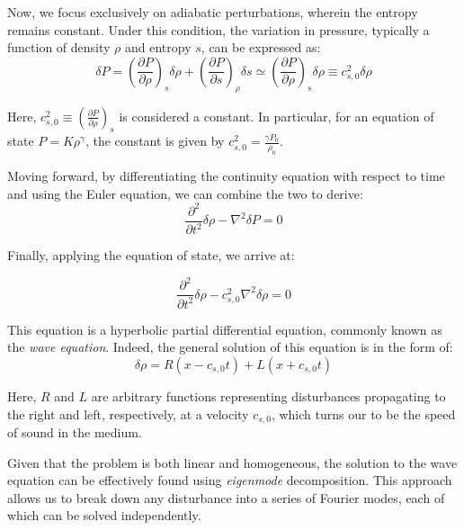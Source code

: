 Now, we focus exclusively on adiabatic perturbations, wherein the entropy remains constant. Under this condition, the variation in pressure, typically a function of density \( \rho \) and entropy \( s \), can be expressed as:
%
\begin{equation}
\delta P = \left( \frac{\partial P}{\partial \rho} \right)_s \delta \rho + \left( \frac{\partial P}{\partial s} \right)_\rho \delta s \simeq \left( \frac{\partial P}{\partial \rho} \right)_s \delta \rho \equiv c_{s,0}^2 \delta \rho
\end{equation}

Here, \( c_{s,0}^2 \equiv  \left( \frac{\partial P}{\partial \rho} \right)_s \) is considered a constant. In particular, for an equation of state \( P = K \rho^\gamma \), the constant is given by \( c_{s,0}^2 = \frac{\gamma P_0}{\rho_0} \).

Moving forward, by differentiating the continuity equation with respect to time and using the Euler equation, we can combine the two to derive:
%
\begin{equation}
\frac{\partial^2}{\partial t^2} \delta \rho - \nabla^2 \delta P = 0
\end{equation}

Finally, applying the equation of state, we arrive at:
%
\begin{remark}
\begin{equation}
\frac{\partial^2}{\partial t^2} \delta \rho - c_{s,0}^2 \nabla^2 \delta \rho = 0
\end{equation}
\end{remark}

This equation is a hyperbolic partial differential equation, commonly known as the \emph{wave equation}. 
%
Indeed, the general solution of this equation is in the form of:
%
\begin{equation}
\delta \rho = R(x - c_{s,0} t) + L (x + c_{s,0} t)
\end{equation}

Here, \( R \) and \( L \) are arbitrary functions representing disturbances propagating to the right and left, respectively, at a velocity \( c_{s,0} \), which turns our to be the speed of sound in the medium.

Given that the problem is both linear and homogeneous, the solution to the wave equation can be effectively found using \emph{eigenmode} decomposition. This approach allows us to break down any disturbance into a series of Fourier modes, each of which can be solved independently.

